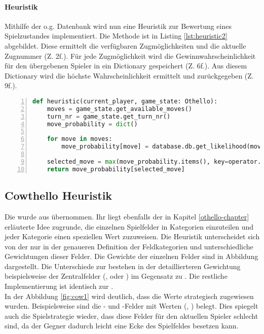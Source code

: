 \paragraph{Heuristik}
\label{para:heuristic1}
Mithilfe der o.g. Datenbank wird  nun eine Heuristik zur Bewertung eines Spielzustandes implementiert. Die Methode  ist in Listing \ref{lst:heuristic2} abgebildet. Diese ermittelt die verfügbaren Zugmöglichkeiten und die aktuelle Zugnummer (Z. 2f.). Für jede Zugmöglichkeit wird die Gewinnwahrscheinlichkeit für den übergebenen Spieler in ein Dictionary gespeichert (Z. 6f.). Aus diesem Dictionary wird die höchste Wahrscheinlichkeit ermittelt und zurückgegeben (Z. 9f.).
\begin{lstlisting}[basicstyle=\footnotesize, caption = {Stored Monte-Carlo-Heuristik Funktion}, language = python, captionpos = t , numbers=left, label={lst:heuristic2}]
def heuristic(current_player, game_state: Othello):
	moves = game_state.get_available_moves()
	turn_nr = game_state.get_turn_nr()
	move_probability = dict()

	for move in moves:
		move_probability[move] = database.db.get_likelihood(move, turn_nr, current_player)

	selected_move = max(move_probability.items(), key=operator.itemgetter(1))[0]
 	return move_probability[selected_move]
\end{lstlisting}

\subsection{Cowthello Heuristik}
Die  wurde aus \cite{cow1} übernommen. Ihr liegt ebenfalls der in Kapitel \ref{othello-chapter} erläuterte Idee zugrunde, die einzelnen Spielfelder in Kategorien einzuteilen und jeder Kategorie einen speziellen Wert zuzuweisen. Die Heuristik unterscheidet sich von der  nur in der genaueren Definition der Feldkategorien und unterschiedliche Gewichtungen dieser Felder.
Die Gewichte der einzelnen Felder sind in Abbildung dargestellt. Die Unterschiede zur  bestehen in der detaillierteren Gewichtung beispielsweise der Zentralfelder (,  oder ) im Gegensatz zu . Die restliche Implementierung ist identisch zur .
\\
In der Abbildung \ref{fig:cow1} wird deutlich, dass die Werte strategisch zugewiesen wurden. Beispielsweise sind die - und -Felder mit  Werten (, ) belegt. Dies spiegelt auch die Spielstrategie wieder, dass diese Felder für den aktuellen Spieler schlecht sind, da der Gegner dadurch leicht eine Ecke des Spielfeldes besetzen kann.
